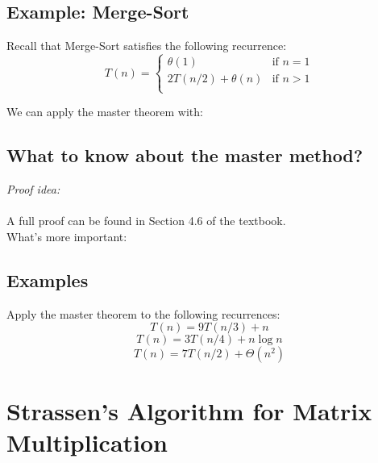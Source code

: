 \documentclass[11  pt]{article}
\begin{document}
\subsection{Example: Merge-Sort}

Recall that Merge-Sort satisfies the following recurrence:
\begin{equation}
	T(n) = \begin{cases}
		\theta(1) & \text{if $n = 1$} \\
		2T(n/2) + \theta(n) & \text{if $n > 1$} \\
	\end{cases}
\end{equation}

We can apply the master theorem with:\\

\vs{2cm} 

%

\subsection{What to know about the master method?}

\emph{Proof idea:} \\ \\%

A full proof can be found in Section 4.6 of the textbook. \\


What's more important:  %

\subsection{Examples}
Apply the master theorem to the following recurrences:
\begin{equation}
	T(n) = 9 T(n/3) + n
\end{equation}
\begin{equation}
	T(n) = 3 T(n/4) + n \log n
\end{equation}
\begin{equation}
	T(n) = 7 T(n/2) + \Theta(n^2)
\end{equation}
\newpage

\section{Strassen's Algorithm for Matrix Multiplication}
\end{document}
